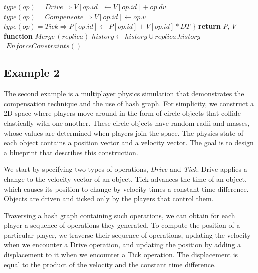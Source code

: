 \documentclass{article}
\begin{document}
\begin{algorithm}
\begin{algorithmic}
\State \hspace{\algorithmicindent}\hspace{\algorithmicindent} $type(op) = Drive \Rightarrow V[op.id] \leftarrow V[op.id] + op.dv$
\State \hspace{\algorithmicindent}\hspace{\algorithmicindent} $type(op) = Compensate \Rightarrow V[op.id] \leftarrow op.v$
\State \hspace{\algorithmicindent}\hspace{\algorithmicindent} $type(op) = Tick \Rightarrow P[op.id] \leftarrow P[op.id] + V[op.id] * DT$
\State {}
\State \hspace{\algorithmicindent} $\}$
\State \hspace{\algorithmicindent} \textbf{return} $P,\,V$
\State
\State \textbf{function} $Merge\,(replica)$
\State \hspace{\algorithmicindent} $history \leftarrow history \cup replica.history$ 
\State \hspace{\algorithmicindent} $\_EnforceConstraints()$
\end{algorithmic}
\end{algorithm}

\subsection{Example 2}

The second example is a multiplayer physics simulation that demonstrates the compensation technique and the use of hash graph. For simplicity, we construct a 2D space where players move around in the form of circle objects that collide elastically with one another. These circle objects have random radii and masses, whose values are determined when players join the space. The physics state of each object contains a position vector and a velocity vector. The goal is to design a blueprint that describes this construction.

We start by specifying two types of operations, \textit{Drive} and \textit{Tick}. Drive applies a change to the velocity vector of an object. Tick advances the time of an object, which causes its position to change by velocity times a constant time difference. Objects are driven and ticked only by the players that control them.

Traversing a hash graph containing such operations, we can obtain for each player a sequence of operations they generated. To compute the position of a particular player, we traverse their sequence of operations, updating the velocity when we encounter a Drive operation, and updating the position by adding a displacement to it when we encounter a Tick operation. The displacement is equal to the product of the velocity and the constant time difference.
\end{document}
